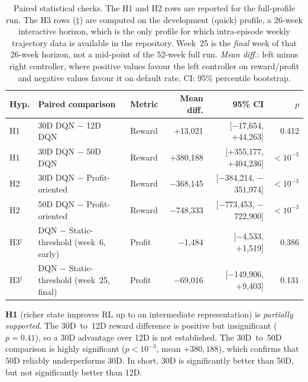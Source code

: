 \documentclass[preprint,review,authoryear,12pt]{elsarticle}
\begin{document}
\begin{table}[t]
    \centering
    \small
    \caption{Paired statistical checks. The H1 and H2 rows are reported for the
        full-profile run. The H3 rows ($\ddagger$) are computed on the development (quick)
        profile, a 26-week interactive horizon, which is the only profile for which
        intra-episode weekly trajectory data is available in the repository. Week~25 is the
        \emph{final} week of that 26-week horizon, not a mid-point of the 52-week full run.
        \textit{Mean diff.}: left minus right controller, where positive values favour the
        left controller on reward/profit and negative values favour it on default rate. CI:
        95\% percentile bootstrap.}
    \label{tab:stat-tests}
    \setlength{\tabcolsep}{4pt}
    \begin{tabular}{l >{\raggedright\arraybackslash}p{} l r r r}
        \toprule
        Hyp.          & Paired comparison                         & Metric & Mean diff.   & 95\% CI                      & $p$          \\
        \midrule
        H1            & 30D DQN $-$ 12D DQN                       & Reward & +13{,}021    & [$-$17{,}654, +44{,}263]     & 0.412        \\
        H1            & 30D DQN $-$ 50D DQN                       & Reward & +380{,}188   & [+355{,}177, +404{,}236]     & $<\!10^{-3}$ \\
        H2            & 30D DQN $-$ Profit-oriented               & Reward & $-$368{,}145 & [$-$384{,}214, $-$351{,}974] & $<\!10^{-3}$ \\
        H2            & 50D DQN $-$ Profit-oriented               & Reward & $-$748{,}333 & [$-$773{,}453, $-$722{,}900] & $<\!10^{-3}$ \\
        H3$^\ddagger$ & DQN $-$ Static-threshold (week~6, early)  & Profit & $-$1{,}484   & [$-$4{,}533, +1{,}519]       & 0.386        \\
        H3$^\ddagger$ & DQN $-$ Static-threshold (week~25, final) & Profit & $-$69{,}016  & [$-$149{,}906, +9{,}403]     & 0.131        \\
        \bottomrule
    \end{tabular}
\end{table}

\textbf{H1} (richer state improves RL up to an intermediate representation) is
\emph{partially supported}. The 30D~to~12D reward difference is positive but
insignificant ($p = 0.41$), so a 30D advantage over 12D is not established. The
30D~to~50D comparison is highly significant ($p<10^{-3}$, mean $+380{,}188$), which
confirms that 50D reliably underperforms 30D. In short, 30D is significantly better than
50D, but not significantly better than 12D.
\end{document}
